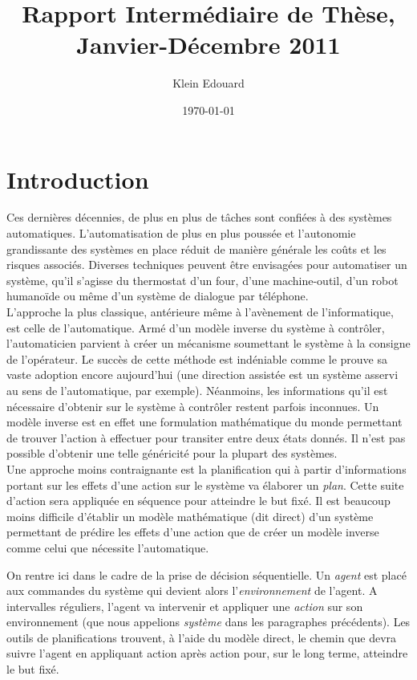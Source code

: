 \documentclass[11pt]{article}
\title{Rapport Intermédiaire de Thèse, Janvier-Décembre 2011}
\author{Klein Edouard}
\date{\today}
\begin{document}
\maketitle

\setcounter{tocdepth}{3}
\tableofcontents
\vspace*{1cm}




\section{Introduction}
\label{sec-1}

  
  Ces dernières décennies, de plus en plus de tâches sont confiées à des systèmes automatiques. L'automatisation de plus en plus poussée et l'autonomie grandissante des systèmes en place réduit de manière générale les coûts et les risques associés. Diverses techniques peuvent être envisagées pour automatiser un système, qu'il s'agisse du thermostat d'un four, d'une machine-outil, d'un robot humanoïde ou même d'un système de dialogue par téléphone.\\
  
  L'approche la plus classique, antérieure même à l'avènement de l'informatique, est celle de l'automatique. Armé d'un modèle inverse du système à contrôler, l'automaticien parvient à créer un mécanisme soumettant le système à la consigne de l'opérateur. Le succès de cette méthode est indéniable comme le prouve sa vaste adoption encore aujourd'hui (une direction assistée est un système asservi au sens de l'automatique, par exemple). Néanmoins, les informations qu'il est nécessaire d'obtenir sur le système à contrôler restent parfois inconnues. Un modèle inverse est en effet une formulation mathématique du monde permettant de trouver l'action à effectuer pour transiter entre deux états donnés. Il n'est pas possible d'obtenir une telle généricité pour la plupart des systèmes.\\
  
  Une approche moins contraignante est la planification qui à partir d'informations portant sur les effets d'une action sur le système va élaborer un \emph{plan}. Cette suite d'action sera appliquée en séquence pour atteindre le but fixé. Il est beaucoup moins difficile d'établir un modèle mathématique (dit direct) d'un système permettant de prédire les effets d'une action que de créer un modèle inverse comme celui que nécessite l'automatique.

  On rentre ici dans le cadre de la prise de décision séquentielle. Un \emph{agent} est placé aux commandes du système qui devient alors l'\emph{environnement} de l'agent. A intervalles réguliers, l'agent va intervenir et appliquer une \emph{action} sur son environnement (que nous appelions \emph{système} dans les paragraphes précédents). Les outils de planifications trouvent, à l'aide du modèle direct, le chemin que devra suivre l'agent en appliquant action après action pour, sur le long terme, atteindre le but fixé.\\
\end{document}
